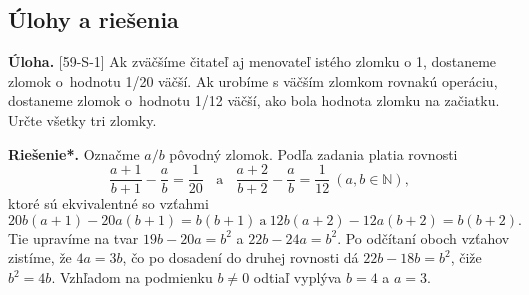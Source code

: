 \documentclass[11pt,a4paper,oneside,final]{book}
\newcommand{\NN}{\mathbb{N}}
\newcommand{\ul}{\textbf{Úloha.} }
\newcommand{\rieh}{\textbf{Riešenie*.} }
\begin{document}
\subsection*{Úlohy a riešenia}
\begin{tcolorbox}[breakable,notitle,boxrule=0pt,colback=light-gray,colframe=light-gray]\ul [59-S-1]
 Ak zväčšíme čitateľ aj menovateľ istého zlomku o 1, dostaneme zlomok o~hodnotu 1/20 väčší. Ak urobíme s väčším zlomkom rovnakú operáciu, dostaneme zlomok o~hodnotu 1/12 väčší, ako bola hodnota zlomku na začiatku. Určte všetky tri zlomky.

\end{tcolorbox}

\rieh Označme $a/b$ pôvodný zlomok. Podľa zadania platia rovnosti
$$\frac{a+1}{b+1}-\frac{a}{b}=\frac{1}{20} \ \ \ \ \text{a} \ \ \ \ \frac{a+2}{b+2}-\frac{a}{b}=\frac{1}{12} \ (a,b\in \NN),$$
ktoré sú ekvivalentné so vzťahmi
$$20b(a + 1) - 20a(b + 1) = b(b + 1) \ \text{a} \ 12b(a + 2) - 12a(b + 2) = b(b + 2).$$
Tie upravíme na tvar $19b - 20a = b^2$ a $22b - 24a = b^2$. Po odčítaní oboch vzťahov zistíme, že $4a = 3b$, čo po dosadení do druhej rovnosti dá $22b - 18b = b^2$, čiže $b^2 = 4b$. Vzhľadom na podmienku $b\neq 0$ odtiaľ vyplýva $b = 4$ a $a = 3$.
\end{document}
